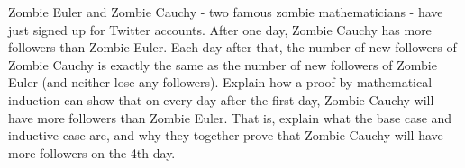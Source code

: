 \begin{questions}







\question Zombie Euler and Zombie Cauchy - two famous zombie mathematicians - have just signed up for Twitter accounts.  After one day, Zombie Cauchy has more followers than Zombie Euler.  Each day after that, the number of new followers of Zombie Cauchy is exactly the same as the number of new followers of Zombie Euler (and neither lose any followers).  Explain how a proof by mathematical induction can show that on every day after the first day, Zombie Cauchy will have more followers than Zombie Euler.  That is, explain what the base case and inductive case are, and why they together prove that Zombie Cauchy will have more followers on the 4th day.

%  
%    
%    


\end{questions}
